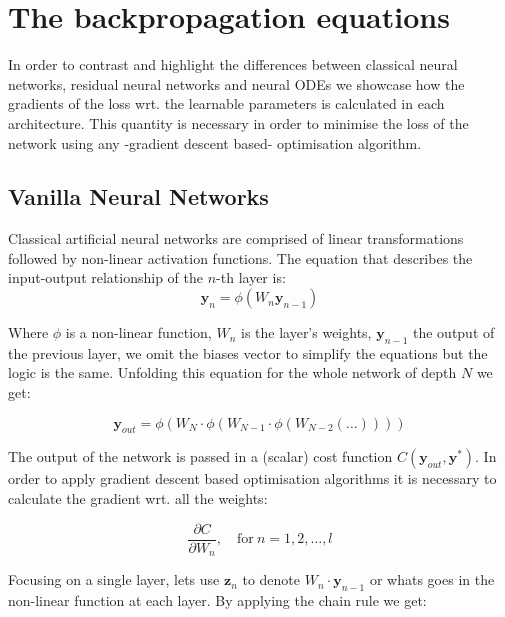 \documentclass[11pt]{article}
\begin{document}
    \newpage

    \printbibliography

    \appendix


    \section{The backpropagation equations}
    In order to contrast and highlight the differences between classical neural networks, residual neural networks and neural ODEs we showcase how the gradients of the loss wrt.
    the learnable parameters is calculated in each architecture.
    This quantity is necessary in order to minimise the loss of the network using any -gradient descent based- optimisation algorithm.

    \subsection{Vanilla Neural Networks}
    Classical artificial neural networks are comprised of linear transformations followed by non-linear activation functions.
    The equation that describes the input-output relationship of the $n$-th layer is:
    \begin{equation}
        \bm{y}_{n} = \phi( W_{n} \bm{y}_{n-1} )
    \end{equation}

    Where $\phi$ is a non-linear function, $W_n$ is the layer's weights, $\bm{y}_{n-1}$ the output of the previous layer, we omit the biases vector to simplify the equations but the logic is the same.
    Unfolding this equation for the whole network of depth $N$ we get:

    \begin{equation}
        \bm{y}_{out} = \phi ( W_{N} \cdot \phi(W_{N-1} \cdot  \phi(W_{N-2}( \dots ))))
    \end{equation}

    The output of the network is passed in a (scalar) cost function $C(\bm{y}_{out},\bm{y}^*)$.
    In order to apply gradient descent based optimisation algorithms it is necessary to calculate the gradient wrt.
    all the weights:

    \begin{equation}
        \frac{ \partial C}{\partial W_{n} }, \quad \text{for} \ n=1,2,\dots,l
    \end{equation}

    Focusing on a single layer, lets use $\textbf{z}_{n}$ to denote $W_{n}\cdot \textbf{y}_{n-1}$ or whats goes in the non-linear function at each layer.
    By applying the chain rule we get:
\end{document}
